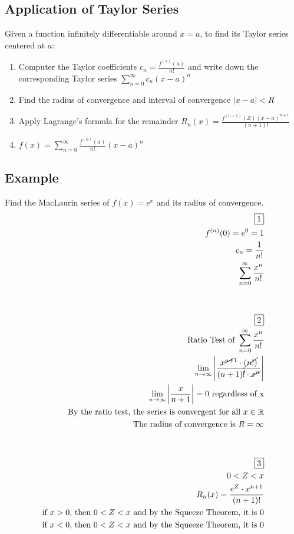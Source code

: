 \documentclass{article}
\begin{document}
\subsection*{Application of Taylor Series}
Given a function infinitely differentiable around $x=a$, to find its Taylor series centered at $a$:\\
\begin{enumerate}
\item Computer the Taylor coefficients $c_n=\frac{f^{(n)}(a)}{n!}$ and write down the corresponding Taylor series $\displaystyle \sum^\infty_{n=0}c_n(x-a)^n$
\item Find the radius of convergence and interval of convergence $|x-a|<R$
\item Apply Lagrange's formula for the remainder $R_n(x)=\frac{f^{(n+1)}(Z)(x-a)^{n+1} }{(n+1)!}$
\item $f(x)=\displaystyle \sum^\infty_{n=0}\frac{f^{(n)}(a)}{n!}(x-a)^n$
\end{enumerate}
\subsection*{Example}
Find the MacLaurin series of $f(x)=e^x$ and its radius of convergence.
\begin{equation}
\begin{aligned}
\boxed{1}\\
f^{(n)}(0)=e^0=1\\
c_n=\frac{1}{n!}\\
\displaystyle \sum^\infty_{n=0}\frac{x^n}{n!}\\\\\\
\boxed{2}\\
\text{Ratio Test of }\sum^\infty_{n=0}\frac{x^n}{n!}\\
\lim_{n\to\infty}\left|\frac{x^{\cancel{n+}1} \cdot \cancel{(n!)} }{(n+1)\cancel{!} \cdot \cancel{x^n} }\right|\\
\lim_{n\to\infty}\left|\frac{x}{n+1}\right|=0 \text{ regardless of x}\\
\text{By the ratio test, the series is convergent for all }x\in \mathbb{R}\\
\text{The radius of convergence is }R=\infty\\\\\\
\boxed{3}\\
0 < Z < x\\
R_n(x)=\frac{e^Z \cdot x^{n+1} }{(n+1)!}\\
\text{if }x>0\text{, then }0<Z<x\text{ and by the Squeeze Theorem, it is }0\\
\text{if }x<0\text{, then }0<Z<x\text{ and by the Squeeze Theorem, it is }0\\
\end{aligned}
\end{equation}
\end{document}
